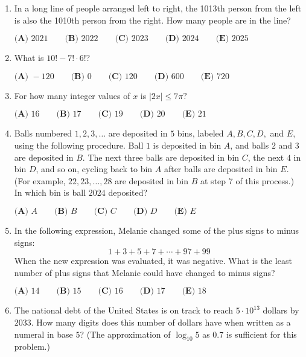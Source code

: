 \documentclass{article}
\begin{document}
\begin{enumerate}[label=\arabic*., itemsep=0.5em]\item In a long line of people arranged left to right, the 1013th person from the left is also the 1010th person from the right. How many people are in the line?

\(\textbf{(A) } 2021 \qquad\textbf{(B) } 2022 \qquad\textbf{(C) } 2023 \qquad\textbf{(D) } 2024 \qquad\textbf{(E) } 2025\)\par \vspace{0.5em}\item What is \(10! - 7! \cdot 6!\)?

\(\textbf{(A) }-120 \qquad\textbf{(B) }0 \qquad\textbf{(C) }120 \qquad\textbf{(D) }600 \qquad\textbf{(E) }720 \qquad\)\par \vspace{0.5em}\item For how many integer values of \(x\) is \(|2x|\leq 7\pi?\)

\(\textbf{(A) }16 \qquad\textbf{(B) }17\qquad\textbf{(C) }19\qquad\textbf{(D) }20\qquad\textbf{(E) }21\)\par \vspace{0.5em}\item Balls numbered \(1,2,3,\ldots\) are deposited in \(5\) bins, labeled \(A,B,C,D,\) and \(E\), using the following procedure. Ball \(1\) is deposited in bin \(A\), and balls \(2\) and \(3\) are deposited in \(B\). The next three balls are deposited in bin \(C\), the next \(4\) in bin \(D\), and so on, cycling back to bin \(A\) after balls are deposited in bin \(E\). (For example, \(22,23,\ldots,28\) are deposited in bin \(B\) at step 7 of this process.) In which bin is ball \(2024\) deposited?

\(\textbf{(A) }A\qquad\textbf{(B) }B\qquad\textbf{(C) }C\qquad\textbf{(D) }D\qquad\textbf{(E) }E\)\par \vspace{0.5em}\item In the following expression, Melanie changed some of the plus signs to minus signs:
\begin{equation*}
1 + 3+5+7+\cdots+97+99
\end{equation*}
When the new expression was evaluated, it was negative. What is the least number of plus signs that Melanie could have changed to minus signs?

\(
\textbf{(A) }14 \qquad
\textbf{(B) }15 \qquad
\textbf{(C) }16 \qquad
\textbf{(D) }17 \qquad
\textbf{(E) }18 \qquad
\)\par \vspace{0.5em}\item The national debt of the United States is on track to reach \(5 \cdot 10^{13}\) dollars by \(2033\). How many digits does this number of dollars have when written as a numeral in base \(5\)? (The approximation of \(\log_{10} 5\) as \(0.7\) is sufficient for this problem.)


\end{enumerate}
\end{document}
